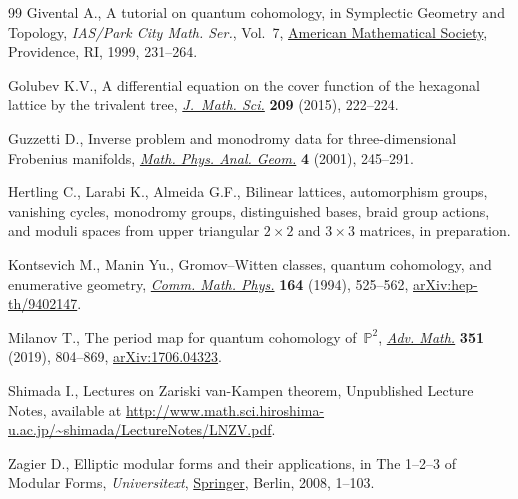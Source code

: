 \documentclass[11pt]{article}
\numberwithin{equation}{section}
\numberwithin{equation}{section}
\begin{document}
\begin{thebibliography}{99}
Givental A., A tutorial on quantum cohomology, in Symplectic {G}eometry and
 {T}opology, \textit{IAS/Park City Math. Ser.}, Vol.~7,
 \href{https://doi.org/10.1090/pcms/007/06}{American Mathematical Society},
 Providence, RI, 1999, 231--264.

Golubev K.V., A differential equation on the cover function of the hexagonal
 lattice by the trivalent tree,
 \href{https://doi.org/10.1007/s10958-015-2497-z}{\textit{J.~Math. Sci.}}
 \textbf{209} (2015), 222--224.

Guzzetti D., Inverse problem and monodromy data for three-dimensional
 {F}robenius manifolds,
 \href{https://doi.org/10.1023/A:1012933622521}{\textit{Math. Phys. Anal.
 Geom.}} \textbf{4} (2001), 245--291.

Hertling C., Larabi K., Almeida G.F., Bilinear lattices, automorphism groups,
 vanishing cycles, monodromy groups, distinguished bases, braid group actions,
 and moduli spaces from upper triangular $2 \times 2$ and $3 \times 3$
 matrices, {i}n preparation.

Kontsevich M., Manin Yu., Gromov--{W}itten classes, quantum cohomology, and
 enumerative geometry, \href{https://doi.org/10.1007/BF02101490}{\textit{Comm.
 Math. Phys.}} \textbf{164} (1994), 525--562,
 \href{http://arxiv.org/abs/hep-th/9402147}{arXiv:hep-th/9402147}.

Milanov T., The period map for quantum cohomology of~{$\mathbb{P}^2$},
 \href{https://doi.org/10.1016/j.aim.2019.05.011}{\textit{Adv. Math.}}
 \textbf{351} (2019), 804--869,
 \href{http://arxiv.org/abs/1706.04323}{arXiv:1706.04323}.

Shimada I., Lectures on {Z}ariski van-{K}ampen theorem, {U}npublished Lecture
 Notes, available at
 \url{http://www.math.sci.hiroshima-u.ac.jp/~shimada/LectureNotes/LNZV.pdf}.

Zagier D., Elliptic modular forms and their applications, in The 1--2--3 of
 {M}odular {F}orms, \textit{Universitext},
 \href{https://doi.org/10.1007/978-3-540-74119-0_1}{Springer}, Berlin, 2008,
 1--103.

\end{thebibliography}
\end{document}
